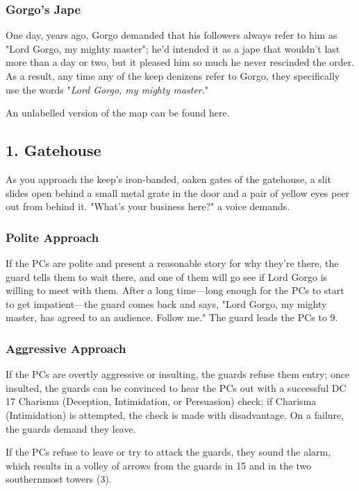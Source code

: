 \documentclass[10pt,a4paper,twoside,bg=print,twocolumn,openany,nodeprecatedcode]{dndbook}
\begin{document}
\subsubsection{Gorgo's Jape}
One day, years ago, Gorgo demanded that his followers always refer to him as "Lord Gorgo, my mighty master"; he'd intended it as a jape that wouldn't last more than a day or two, but it pleased him so much he never rescinded the order. As a result, any time any of the keep denizens refer to Gorgo, they specifically use the words "\textit{Lord Gorgo, my mighty master}."

An unlabelled version of the map can be found here.

\subsection{1. Gatehouse}
\begin{DndReadAloud}{}
As you approach the keep's iron-banded, oaken gates of the gatehouse, a slit slides open behind a small metal grate in the door and a pair of yellow eyes peer out from behind it. "What's your business here?" a voice demands.

\end{DndReadAloud}

\subsubsection{Polite Approach}
If the PCs are polite and present a reasonable story for why they're there, the guard tells them to wait there, and one of them will go see if Lord Gorgo is willing to meet with them. After a long time—long enough for the PCs to start to get impatient—the guard comes back and says, "Lord Gorgo, my mighty master, has agreed to an audience. Follow me." The guard leads the PCs to 9.

\subsubsection{Aggressive Approach}
If the PCs are overtly aggressive or insulting, the guards refuse them entry; once insulted, the guards can be convinced to hear the PCs out with a successful DC 17 Charisma (Deception, Intimidation, or Persuasion) check; if Charisma (Intimidation) is attempted, the check is made with disadvantage. On a failure, the guards demand they leave.

If the PCs refuse to leave or try to attack the guards, they sound the alarm, which results in a volley of arrows from the guards in 15 and in the two southernmost towers (3).
\end{document}
